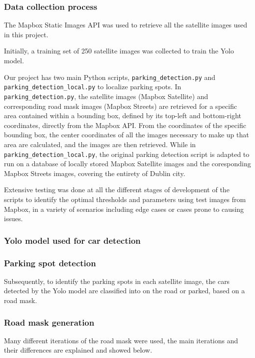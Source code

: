 \subsubsection{Data collection process}
The Mapbox Static Images API was used to retrieve all the satellite images used in this project.

Initially, a training set of 250 satellite images was collected to train the Yolo model.

Our project has two main Python scripts, \texttt{parking\_detection.py} and \texttt{parking\_detection\_local.py} to localize parking spots.
In \texttt{parking\_detection.py}, the satellite images (Mapbox Satellite) and corresponding road mask images (Mapbox Streets) are retrieved for a specific area contained within a bounding box, defined by its top-left and bottom-right coordinates, directly from the Mapbox API.
From the coordinates of the specific bounding box, the center coordinates of all the images necessary to make up that area are calculated, and the images are then retrieved.
While in \texttt{parking\_detection\_local.py}, the original parking detection script is adapted to run on a database of locally stored Mapbox Satellite images and the coresponding Mapbox Streets images, covering the entirety of Dublin city.

Extensive testing was done at all the different stages of development of the scripts to identify the optimal thresholds and parameters using test images from Mapbox, in a variety of scenarios including edge cases or cases prone to causing issues.

\subsubsection{Yolo model used for car detection}


\subsubsection{Parking spot detection}
Subsequently, to identify the parking spots in each satellite image, the cars detected by the Yolo model are classified into on the road or parked, based on a road mask.

\subsubsection{Road mask generation}
Many different iterations of the road mask were used, the main iterations and their differences are explained and showed below.

